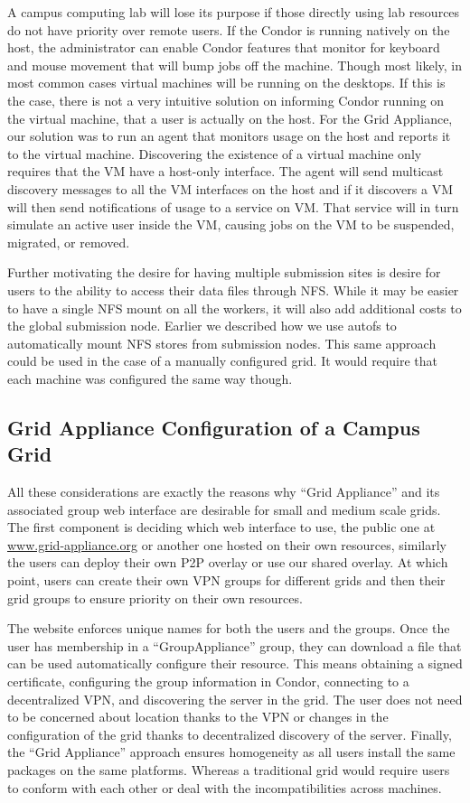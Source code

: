 \documentclass[conference]{IEEEtran}
\begin{document}
A campus computing lab will lose its purpose if those directly using lab
resources do not have priority over remote users.  If the Condor is running
natively on the host, the administrator can enable Condor features that monitor
for keyboard and mouse movement that will bump jobs off the machine.  Though
most likely, in most common cases virtual machines will be running on the
desktops.  If this is the case, there is not a very intuitive solution on
informing Condor running on the virtual machine, that a user is actually on the
host.  For the Grid Appliance, our solution was to run an agent that monitors
usage on the host and reports it to the virtual machine.  Discovering the
existence of a virtual machine only requires that the VM have a host-only
interface.  The agent will send multicast discovery messages to all the VM
interfaces on the host and if it discovers a VM will then send notifications of
usage to a service on VM.  That service will in turn simulate an active user
inside the VM, causing jobs on the VM to be suspended, migrated, or removed.

Further motivating the desire for having multiple submission sites is desire
for users to the ability to access their data files through NFS.  While it may
be easier to have a single NFS mount on all the workers, it will also add
additional costs to the global submission node.  Earlier we described how we
use autofs to automatically mount NFS stores from submission nodes.  This same
approach could be used in the case of a manually configured grid.  It would
require that each machine was configured the same way though.

\subsection{Grid Appliance Configuration of a Campus Grid}

All these considerations are exactly the reasons why ``Grid Appliance'' and its
associated group web interface are desirable for small and medium scale grids.
The first component is deciding which web interface to use, the public one at
\url{www.grid-appliance.org} or another one hosted on their own resources,
similarly the users can deploy their own P2P overlay or use our shared overlay.
At which point, users can create their own VPN groups for different grids and
then their grid groups to ensure priority on their own resources.

The website enforces unique names for both the users and the groups.  Once the
user has membership in a ``GroupAppliance'' group, they can download a file
that can be used automatically configure their resource.  This means obtaining
a signed certificate, configuring the group information in Condor, connecting
to a decentralized VPN, and discovering the server in the grid.  The user does
not need to be concerned about location thanks to the VPN or changes in the
configuration of the grid thanks to decentralized discovery of the server.
Finally, the ``Grid Appliance'' approach ensures homogeneity as all users
install the same packages on the same platforms.  Whereas a traditional grid
would require users to conform with each other or deal with the
incompatibilities across machines.
\end{document}
